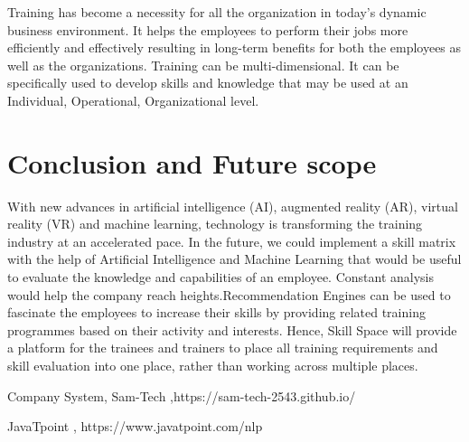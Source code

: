 \documentclass[conference]{IEEEtran}
\begin{document}
Training has become a necessity for all the organization in today’s dynamic business 
environment. It helps the employees to perform their jobs more efficiently and effectively 
resulting in long-term benefits for both the employees as well as the organizations. Training 
can be multi-dimensional. It can be specifically used to develop skills and knowledge that may 
be used at an Individual, Operational, Organizational level.


\section*{Conclusion and Future scope}

With new advances in artificial intelligence (AI), augmented reality (AR),
virtual reality (VR) and machine learning, technology is transforming the training industry at an accelerated pace. In the future, we could implement a skill matrix with the help of Artificial Intelligence and Machine Learning that would be useful to evaluate the knowledge and capabilities of an employee. Constant analysis would help the company reach heights.Recommendation Engines can be used to fascinate the employees to increase their skills by providing related training programmes based on their activity and interests. Hence, Skill Space will provide a platform for the trainees and trainers to place all training requirements and skill evaluation into one place, rather than working across multiple places.


	\begin{thebibliography} {}
	
	Company System, Sam-Tech ,https://sam-tech-2543.github.io/
	
	JavaTpoint , https://www.javatpoint.com/nlp

	
	\end{thebibliography}
	
\end{document}
